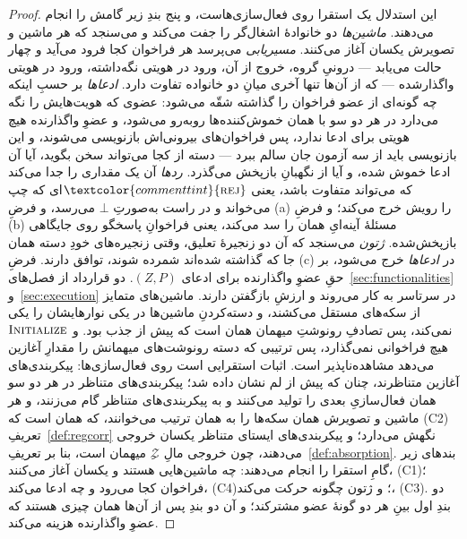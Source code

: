 \documentclass[10pt,oneside,openany]{book}
\newcommand{\Zenv}{\mathcal{Z}}
\newcommand{\op}[1]{\textnormal{\textsc{#1}}}
\newcommand{\atom}[1]{\textcolor{commenttint}{\op{#1}}}
\newcommand{\rej}{\atom{rej}}
\newcommand{\none}{\bot}
\theoremstyle{accentdef}
\theoremstyle{accentplain}
\begin{document}
\begin{proof}
این استدلال یک استقرا روی فعال‌سازی‌هاست، و پنج بندِ زیر گامش را انجام
می‌دهند. \emph{ماشین‌ها} دو خانوادهٔ اشغال‌گر را جفت می‌کند و می‌سنجد که
هر ماشین و تصویرش یکسان آغاز می‌کنند. \emph{مسیریابی} می‌پرسد هر فراخوان
کجا فرود می‌آید و چهار حالت می‌یابد --- درونیِ گروه، خروج از آن، ورود در
هویتی نگه‌داشته، ورود در هویتی واگذارشده --- که از آن‌ها تنها آخری میانِ دو
خانواده تفاوت دارد. \emph{ادعاها} بر حسبِ اینکه چه گونه‌ای از عضو فراخوان
را گذاشته شقّه می‌شود: عضوی که هویت‌هایش را نگه می‌دارد در هر دو سو با
همان خموش‌کننده‌ها روبه‌رو می‌شود، و عضوِ واگذارنده هیچ هویتی برای ادعا
ندارد، پس فراخوان‌های بیرونی‌اش بازنویسی می‌شوند، و این بازنویسی باید از
سه آزمون جان سالم ببرد --- دسته از کجا می‌تواند سخن بگوید، آیا آن ادعا
خموش شده، و آیا از نگهبانِ بازپخش می‌گذرد. \emph{ردها} آن یک مقداری را
جدا می‌کند که می‌تواند متفاوت باشد، یعنی $\rej$ای که چپ می‌خواند و در راست
به‌صورتِ $\none$ می‌رسد، و فرضِ (a) را رویش خرج می‌کند؛ و فرضِ (b) مسئلهٔ
آینه‌ایِ همان را سد می‌کند، یعنی فراخوانِ پاسخگو روی جایگاهی بازپخش‌شده.
\emph{ژتون} می‌سنجد که آن دو زنجیرهٔ تعلیق، وقتی زنجیره‌های خودِ دسته همان
جا که گذاشته شده‌اند شمرده شوند، توافق دارند. فرضِ (c) در \emph{ادعاها}
خرج می‌شود، بر حقِ عضوِ واگذارنده برای ادعای $(Z,P)$.
دو قرارداد از فصل‌های~\ref{sec:functionalities} و~\ref{sec:execution} در
سرتاسر به کار می‌روند و ارزشِ بازگفتن دارند. ماشین‌های متمایز از سکه‌های
مستقل می‌کشند، و دسته‌کردنِ ماشین‌ها در یکی نوارهایشان را یکی نمی‌کند، پس
تصادفِ رونوشتِ میهمان همان است که پیش از جذب بود. و $\op{Initialize}$ هیچ
فراخوانی نمی‌گذارد، پس ترتیبی که دسته رونوشت‌های میهمانش را مقدارِ آغازین
می‌دهد مشاهده‌ناپذیر است. اثبات استقرایی است روی فعال‌سازی‌ها:
پیکربندی‌های آغازین متناظرند، چنان که پیش از لم نشان داده شد؛
پیکربندی‌های متناظر در هر دو سو همان فعال‌سازیِ بعدی را تولید می‌کنند و به
پیکربندی‌های متناظر گام می‌زنند، و هر ماشین و تصویرش همان سکه‌ها را به
همان ترتیب می‌خوانند، که همان است که (C2)ِ تعریفِ~\ref{def:regcorr} نگهش
می‌دارد؛ و پیکربندی‌های ایستای متناظر یکسان خروجی می‌دهند، چون خروجی مالِ
$\Zenv$ِ میهمان است، بنا بر تعریفِ~\ref{def:absorption}. بندهای زیر گامِ
استقرا را انجام می‌دهند: چه ماشین‌هایی هستند و یکسان آغاز می‌کنند، (C1)؛
فراخوان کجا می‌رود و چه ادعا می‌کند، (C4)؛ و ژتون چگونه حرکت می‌کند،
(C3). دو بندِ اول بینِ هر دو گونهٔ عضو مشترکند؛ و آن دو بندِ پس از آن‌ها
همان چیزی هستند که عضوِ واگذارنده هزینه می‌کند.


\end{proof}
\end{document}
